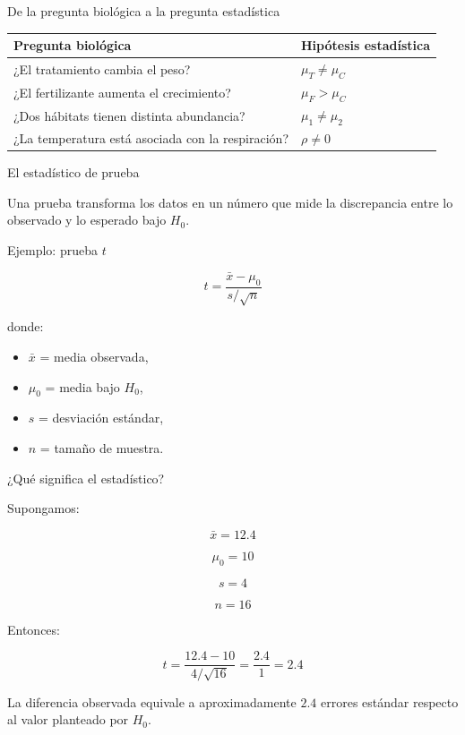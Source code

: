 \documentclass[aspectratio=169,11pt]{beamer}
\begin{document}
\begin{frame}{De la pregunta biológica a la pregunta estadística}

\begin{center}
\begin{tabular}{p{} p{}}
\toprule
\textbf{Pregunta biológica} & \textbf{Hipótesis estadística}\\
\midrule
¿El tratamiento cambia el peso? &
$\mu_T \neq \mu_C$\\[0.2cm]

¿El fertilizante aumenta el crecimiento? &
$\mu_F > \mu_C$\\[0.2cm]

¿Dos hábitats tienen distinta abundancia? &
$\mu_1 \neq \mu_2$\\[0.2cm]

¿La temperatura está asociada con la respiración? &
$\rho \neq 0$\\
\bottomrule
\end{tabular}
\end{center}

\end{frame}

\begin{frame}{El estadístico de prueba}

Una prueba transforma los datos en un número que mide la discrepancia
entre lo observado y lo esperado bajo $H_0$.

Ejemplo: prueba $t$

\[
t=
\frac{\bar{x}-\mu_0}
{s/\sqrt{n}}
\]

donde:

\begin{itemize}
    \item $\bar{x}$ = media observada,
    \item $\mu_0$ = media bajo $H_0$,
    \item $s$ = desviación estándar,
    \item $n$ = tamaño de muestra.
\end{itemize}

\end{frame}

\begin{frame}{¿Qué significa el estadístico?}

Supongamos:

\[
\bar{x}=12.4
\]

\[
\mu_0=10
\]

\[
s=4
\]

\[
n=16
\]

Entonces:

\[
t=
\frac{12.4-10}{4/\sqrt{16}}
=
\frac{2.4}{1}
=
2.4
\]

La diferencia observada equivale a aproximadamente
$2.4$ errores estándar respecto al valor planteado por $H_0$.

\end{frame}
\end{document}

